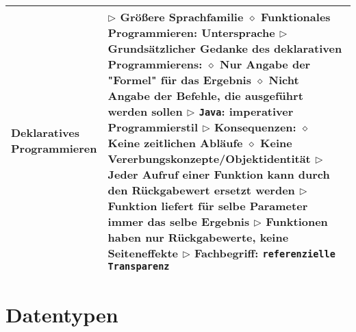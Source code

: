 \begin{tabular}{ | p{} p{} | }
  \makecell[l]{Deklaratives \\ Programmieren} & \makecell[l]{
  $\rhd$ Grö\ss ere Sprachfamilie \\
  \hspace{0.4cm} $\diamond$ Funktionales Programmieren: Untersprache \\
  $\rhd$ Grundsätzlicher Gedanke des deklarativen Programmierens: \\
  \hspace{0.4cm} $\diamond$ Nur Angabe der "Formel" für das Ergebnis \\
  \hspace{0.4cm} $\diamond$ Nicht Angabe der Befehle, die ausgeführt werden sollen \\
  $\rhd$ \texttt{Java}: imperativer Programmierstil \\
  $\rhd$ Konsequenzen: \\
  \hspace{0.4cm} $\diamond$ Keine zeitlichen Abläufe \\
  \hspace{0.4cm} $\diamond$ Keine Vererbungskonzepte/Objektidentität \\
  $\rhd$ Jeder Aufruf einer Funktion kann durch den Rückgabewert ersetzt werden \\
  $\rhd$ Funktion liefert für selbe Parameter \textbf{immer} das selbe Ergebnis \\
  $\rhd$ Funktionen haben nur Rückgabewerte, keine Seiteneffekte \\
  $\rhd$ Fachbegriff: \texttt{referenzielle Transparenz} } \\ \hline

  \end{tabular}




\section{Datentypen} 

